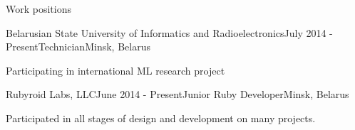 \documentclass{resume} %
\begin{document}

\begin{rSection}{Work positions}

\begin{rSubsection}{Belarusian State University of Informatics and Radioelectronics}{July 2014 - Present}{Technician}{Minsk, Belarus}
\item Participating in international ML research project
\end{rSubsection}

\begin{rSubsection}{Rubyroid Labs, LLC}{June 2014 - Present}{Junior Ruby Developer}{Minsk, Belarus}
\item Participated in all stages of design and development on many projects.
\end{rSubsection}

\end{rSection}


%
%
%
%


\end{document}
